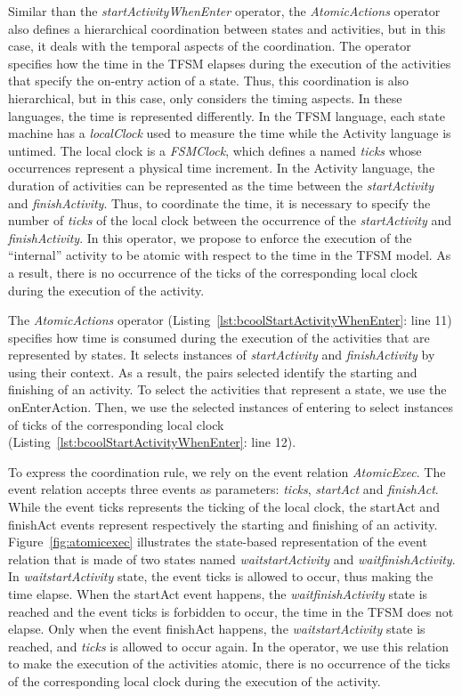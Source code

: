 Similar than the \emph{startActivityWhenEnter} operator, the \emph{AtomicActions} operator also defines a hierarchical coordination between states and activities, but in this case, it deals with the temporal aspects of the coordination. The operator specifies how the time in the TFSM elapses during the execution of the activities that specify the on-entry action of a state. Thus, this coordination is also hierarchical, but in this case, only considers the timing aspects. In these languages, the time is represented differently. In the TFSM language, each state machine has a \emph{localClock} used to measure the time while the Activity language is untimed. The local clock is a \emph{FSMClock}, which defines a \dse named \emph{ticks} whose occurrences represent a physical time increment. In the Activity language, the duration of activities can be represented as the time between the \dse \emph{startActivity} and \dse \emph{finishActivity}. Thus, to coordinate the time, it is necessary to specify the number of \emph{ticks} of the local clock between the occurrence of the \dse \emph{startActivity} and \emph{finishActivity}. In this operator, we propose to enforce the execution of the ``internal'' activity to be atomic with respect to the time in the TFSM model. As a result, there is no occurrence of the \dse ticks of the corresponding local clock during the execution of the activity.

The \emph{AtomicActions} operator (Listing~\ref{lst:bcoolStartActivityWhenEnter}: line 11) specifies how time is consumed during the execution of the activities that are represented by states. It selects instances of \dse \emph{startActivity} and \emph{finishActivity} by using their context. As a result, the pairs selected identify the starting and finishing of an activity. To select the activities that represent a state, we use the onEnterAction. Then, we use the selected instances of \dse entering to select instances of \dse ticks of the corresponding local clock (Listing~\ref{lst:bcoolStartActivityWhenEnter}: line 12). 

To express the coordination rule, we rely on the event relation \emph{AtomicExec}. The event relation accepts three events as parameters: \emph{ticks}, \emph{startAct} and \emph{finishAct}. While the event ticks represents the ticking of the local clock, the startAct and finishAct events represent respectively the starting and finishing of an activity. Figure~\ref{fig:atomicexec} illustrates the state-based representation of the event relation that is made of two states named \emph{waitstartActivity} and \emph{waitfinishActivity}. In \emph{waitstartActivity} state, the event ticks is allowed to occur, thus making the time elapse. When the startAct event happens, the \emph{waitfinishActivity} state is reached and the event ticks is forbidden to occur, \ie the time in the TFSM does not elapse. Only when the event finishAct happens, the \emph{waitstartActivity} state is reached, and \emph{ticks} is allowed to occur again. In the operator, we use this relation to make the execution of the activities atomic, \ie there is no occurrence of the \dse ticks of the corresponding local clock during the execution of the activity.

